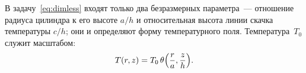 В задачу~\eqref{eq:dimless} входят только два безразмерных параметра~—
отношение радиуса цилиндра к его высоте $a/h$ и относительная высота линии
скачка температуры $c/h$; они и определяют форму температурного поля.
Температура~$T_0$ служит масштабом:
\begin{equation}
\label{eq:scaling}
T(r,z)=T_0\,\theta\Bigl(\frac{r}{a},\frac{z}{h}\Bigr).
\end{equation}
